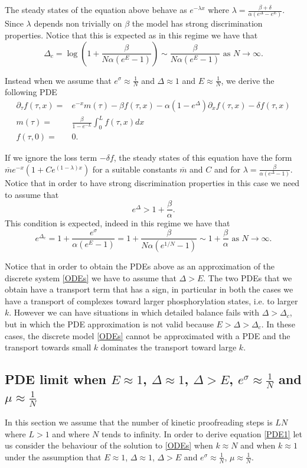 \documentclass{article}
\numberwithin{equation}{section}
\theoremstyle{plain}
\begin{document}
The steady states of the equation above behave as  $ e^{-\lambda x } $ where  $\lambda =  \frac{\beta + \delta }{ \alpha(e^\Delta - e^E) }$. Since $\lambda$ depends non trivially on $\beta$ the model has strong discrimination properties. Notice that this is expected as in this regime we have that 
\[
\Delta_c = \log \left( 1 + \frac{ \beta  }{ N \alpha (e^E-1) } \right) \sim \frac{ \beta  }{ N \alpha (e^E-1) } \text{ as } N \to \infty. 
\]

Instead when we assume that $e^\sigma \approx \frac{1}{N } $ and $\Delta \approx 1$ and  $E\approx \frac{1}{N } $, we derive the following PDE
\begin{align}
\partial_\tau f (\tau ,x) =& e^{-  x } m (\tau )  - \beta  f(\tau, x) - \alpha  (1-e^\Delta)  \partial_x f (\tau,x) - \delta f(\tau,x) \label{PDE2} \\ 
m(\tau ) =& \frac{\beta}{1-e^{-L}}  \int_0^L f(\tau, x) dx \label{PDE2m} \\
f(\tau, 0)=& 0. \label{PDE2bound}
\end{align}

If we ignore the loss term $- \delta f$, the steady states of this equation have the form  $  \overline m e^{- x } \left(  1+ C e^{ (1- \lambda ) x} \right) $ for a suitable constants $\overline  m $ and $C$ and for $\lambda =  \frac{\beta }{ \alpha (e^\Delta -1) }$. Notice that in order to have strong discrimination properties in this case we need to assume that 
\[
e^\Delta > 1+ \frac{ \beta  }{ \alpha }.
\]
This condition is expected, indeed in this regime we have that 
\[
e^{\Delta_c} = 1 + \frac{e^\sigma }{ \alpha (e^E -1 )} = 1 + \frac{\beta  }{ N \alpha (e^{1/N} -1 )}  \sim   1+ \frac{ \beta }{ \alpha } \text{ as } N \to \infty. 
\]

Notice that in order to obtain the PDEs above as an approximation of the discrete system \eqref{ODEs} we have to assume that $\Delta > E $. 
The two PDEs that we obtain have a transport term that has a sign, in particular in both the cases we have a transport of complexes toward larger phosphorylation states, i.e. to larger $k$. 
However we can have situations in which detailed balance fails with $\Delta > \Delta_c$, but in which the PDE approximation is not valid because $E > \Delta > \Delta_c$. In these cases, the discrete model \eqref{ODEs} cannot be approximated with a PDE and the transport towards small $k$ dominates the transport toward large $k$.
\subsection{PDE limit when $E\approx 1 $, $\Delta \approx 1$, $\Delta > E $, $e^\sigma \approx \frac{1}{N}$ and $\mu \approx \frac{1}{N}$} \label{sec:PDE1}
In this section we assume that the number of kinetic proofreading steps is $L N $ where $L > 1$ and where $N $ tends to infinity. 
In order to derive equation \eqref{PDE1} let us consider the behaviour of the solution to \eqref{ODEs} when $k \approx N $ and when $k \approx 1 $ under the assumption that $E\approx 1 $, $\Delta \approx 1$, $\Delta > E $ and $e^\sigma \approx \frac{1}{N}$, $\mu \approx \frac{1}{N}$. 
\end{document}
